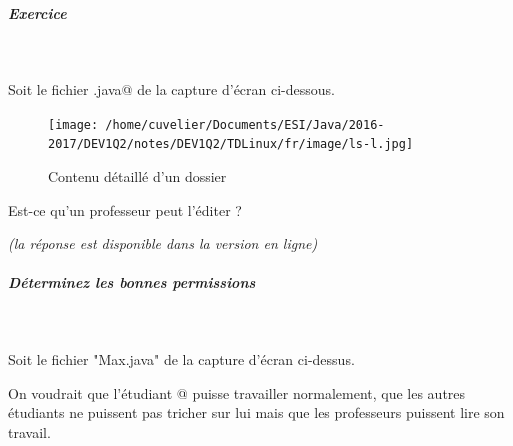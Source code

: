 \documentclass[11pt,a4paper]{article}
\begin{document}
			
		\subparagraph{Exercice } 
		
					\textcolor{white}{.} \par
				
            \par
          
					Soit le fichier \verb@Max.java@ de la capture d'\'ecran ci-dessous.  
				
            \par
        \begin{figure}[hbt]
				    \begin{center}
					\texttt{[image: /home/cuvelier/Documents/ESI/Java/2016-2017/DEV1Q2/notes/DEV1Q2/TDLinux/fr/image/ls-l.jpg]}
						\end{center}
                
                    \caption[Contenu d\'etaill\'e d'un dossier]{Contenu d\'etaill\'e d'un dossier}
                \end{figure}
                    
					Est-ce qu'un professeur peut l'\'editer ? 
				
            \par
         {\footnotesize\emph{(la r\'eponse est disponible dans la version en ligne)}\par} 
			
		\subparagraph{D\'eterminez les bonnes permissions} 
		
                \textcolor{white}{.} \par
            
							Soit le fichier "Max.java" de la capture d'\'ecran ci-dessus.
							
							On voudrait que l'\'etudiant @ puisse travailler  
							normalement, que les autres \'etudiants ne puissent pas tricher sur  
							lui mais que les professeurs puissent lire son travail.   
						
\end{document}
